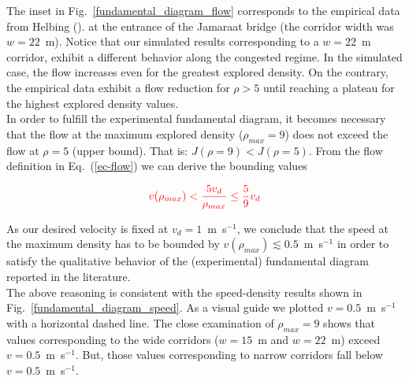 \documentclass[preprint,12pt]{elsarticle}
\begin{document}
The inset in Fig.~\ref{fundamental_diagram_flow} corresponds to the empirical data from Helbing (\cite{helbing3}). at the entrance of the Jamaraat bridge (the corridor width was $w=22$~m). Notice that our simulated results corresponding to a $w=22$~m corridor, exhibit a different behavior along the congested regime. In the simulated case, the flow increases even for the greatest explored density. On the contrary, the empirical data exhibit a flow reduction for $\rho > 5$ until reaching a plateau for the highest explored density values.  \\

In order to fulfill the experimental fundamental diagram, it becomes necessary that the flow at the maximum explored density ($\rho_{max} = 9$) does not exceed the flow at $\rho = 5$ (upper bound). That is:  $J(\rho = 9) < J(\rho = 5)$. From the flow definition in Eq.~(\ref{ec-flow}) we can derive the bounding values


\begin{equation}
\textcolor{red}{v(\rho_{max}) < \frac{5v_d}{\rho_{max}} \leq \frac{5}{9} v_d}\\
\end{equation}

As our desired velocity is fixed at $v_d = 1$~m~s$^{-1}$, we conclude that the speed at 
the maximum density has to be bounded by $v(\rho_{max}) \lesssim  0.5$~m~s$^{-1}$ in 
order to satisfy the qualitative behavior of the (experimental) fundamental 
diagram reported in the literature.\\

The above reasoning is consistent with the speed-density results shown in Fig.~\ref{fundamental_diagram_speed}. As a visual guide we plotted $v=0.5$~m~s$^{-1}$ with a horizontal dashed line. The close examination of $\rho_{max} = 9$ shows that values corresponding to the wide corridors ($w=15$~m and $w=22$~m) exceed $v=0.5$~m~s$^{-1}$. But, those values corresponding to narrow corridors fall below $v=0.5$~m~s$^{-1}$. \\
\end{document}
